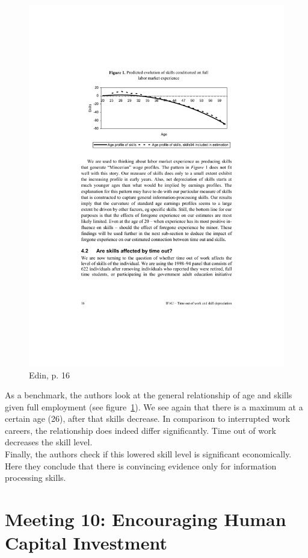 \documentclass[12pt,a4paper]{article}
\begin{document}
  \begin{figure}[ht]
        \centering
        \includegraphics[width=12cm]{edin_age.pdf}
        \caption{Edin, p. 16}
        \label{edin_age}
  \end{figure}

  As a benchmark, the authors look at the general relationship of age and skills given full employment (see figure~\ref{edin_age}).
  We see again that there is a maximum at a certain age (26), after that skills decrease. In comparison to interrupted work
  careers, the relationship does indeed differ significantly. Time out of work decreases the skill level.\\
  Finally, the authors check if this lowered skill level is significant economically. Here they conclude that there is convincing
  evidence only for information processing skills. 


    \section{Meeting 10: Encouraging Human Capital Investment} %
  \label{sec:Meeting 10}
\end{document}
